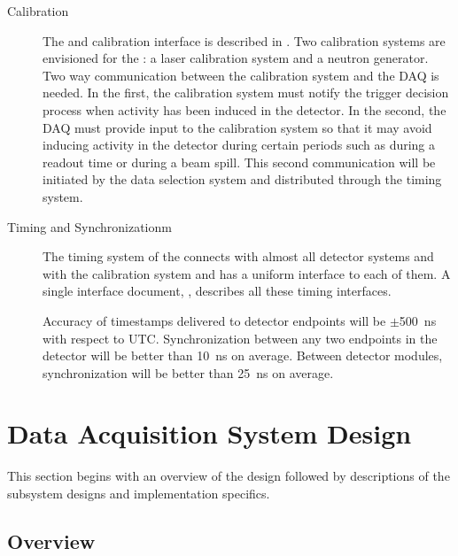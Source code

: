 \begin{description}
\item[Calibration] The  and calibration interface is described in . Two calibration systems are envisioned for the : a laser calibration system and a neutron generator. 
  Two way communication between the calibration system and the DAQ is needed.  In the first, the calibration system must notify the trigger decision process when activity has been induced in the detector.  In the second, the DAQ must provide input to the calibration system so that it may avoid inducing activity in the detector during certain periods such as during a  readout time or during a beam spill.
This second communication will be initiated by the data selection system and distributed through the
 timing system.


\item[Timing and Synchronizationm] The timing system of the   connects with almost all detector systems and with the calibration system and has a uniform interface to each of them. 
  A single interface document, , describes all these timing interfaces. 

Accuracy of timestamps delivered to  detector endpoints will be $\pm$\SI{500}{\nano\second} with respect to UTC.  Synchronization between any two endpoints in the detector will be better than \SI{10}{\nano\second} on average.   Between detector modules, synchronization will be better than \SI{25}{\nano\second} on average.  
\end{description}

\section{Data Acquisition System Design}
\label{sec:fd-daq:design}

This section begins with an overview of the 
design followed by
descriptions of the subsystem designs and implementation specifics.

\subsection{Overview}
\label{sec:fd-daq:design-overview}

